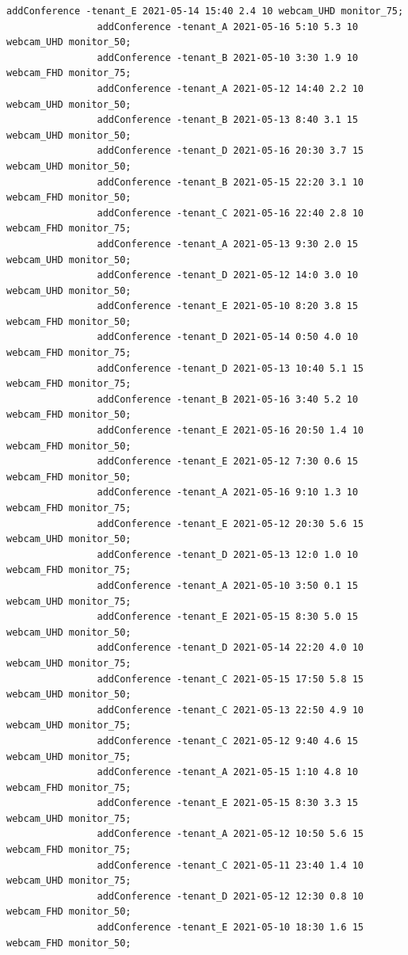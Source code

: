 \documentclass{article}
\begin{document}
\begin{Verbatim}[gobble=8]
                addConference -tenant_E 2021-05-14 15:40 2.4 10 webcam_UHD monitor_75;
                addConference -tenant_A 2021-05-16 5:10 5.3 10 webcam_UHD monitor_50;
                addConference -tenant_B 2021-05-10 3:30 1.9 10 webcam_FHD monitor_75;
                addConference -tenant_A 2021-05-12 14:40 2.2 10 webcam_UHD monitor_50;
                addConference -tenant_B 2021-05-13 8:40 3.1 15 webcam_UHD monitor_50;
                addConference -tenant_D 2021-05-16 20:30 3.7 15 webcam_UHD monitor_50;
                addConference -tenant_B 2021-05-15 22:20 3.1 10 webcam_FHD monitor_50;
                addConference -tenant_C 2021-05-16 22:40 2.8 10 webcam_FHD monitor_75;
                addConference -tenant_A 2021-05-13 9:30 2.0 15 webcam_UHD monitor_50;
                addConference -tenant_D 2021-05-12 14:0 3.0 10 webcam_UHD monitor_50;
                addConference -tenant_E 2021-05-10 8:20 3.8 15 webcam_FHD monitor_50;
                addConference -tenant_D 2021-05-14 0:50 4.0 10 webcam_FHD monitor_75;
                addConference -tenant_D 2021-05-13 10:40 5.1 15 webcam_FHD monitor_75;
                addConference -tenant_B 2021-05-16 3:40 5.2 10 webcam_FHD monitor_50;
                addConference -tenant_E 2021-05-16 20:50 1.4 10 webcam_FHD monitor_50;
                addConference -tenant_E 2021-05-12 7:30 0.6 15 webcam_FHD monitor_50;
                addConference -tenant_A 2021-05-16 9:10 1.3 10 webcam_FHD monitor_75;
                addConference -tenant_E 2021-05-12 20:30 5.6 15 webcam_UHD monitor_50;
                addConference -tenant_D 2021-05-13 12:0 1.0 10 webcam_FHD monitor_75;
                addConference -tenant_A 2021-05-10 3:50 0.1 15 webcam_UHD monitor_75;
                addConference -tenant_E 2021-05-15 8:30 5.0 15 webcam_UHD monitor_50;
                addConference -tenant_D 2021-05-14 22:20 4.0 10 webcam_UHD monitor_75;
                addConference -tenant_C 2021-05-15 17:50 5.8 15 webcam_UHD monitor_50;
                addConference -tenant_C 2021-05-13 22:50 4.9 10 webcam_UHD monitor_75;
                addConference -tenant_C 2021-05-12 9:40 4.6 15 webcam_UHD monitor_75;
                addConference -tenant_A 2021-05-15 1:10 4.8 10 webcam_FHD monitor_75;
                addConference -tenant_E 2021-05-15 8:30 3.3 15 webcam_UHD monitor_75;
                addConference -tenant_A 2021-05-12 10:50 5.6 15 webcam_FHD monitor_75;
                addConference -tenant_C 2021-05-11 23:40 1.4 10 webcam_UHD monitor_75;
                addConference -tenant_D 2021-05-12 12:30 0.8 10 webcam_FHD monitor_50;
                addConference -tenant_E 2021-05-10 18:30 1.6 15 webcam_FHD monitor_50;

\end{Verbatim}
\end{document}

